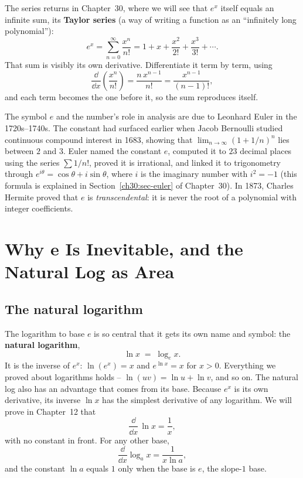 The series returns in Chapter~30, where we will see that $e^x$ itself equals an infinite sum, its \textbf{Taylor series} (a way of writing a function as an ``infinitely long polynomial''):
\[
e^x = \sum_{n=0}^{\infty}\frac{x^n}{n!} = 1 + x + \frac{x^2}{2!} + \frac{x^3}{3!}+\cdots.
\]
That sum is visibly its own derivative. Differentiate it term by term, using
\[
\frac{\dd}{\dd x}\left(\frac{x^n}{n!}\right) = \frac{n\,x^{n-1}}{n!} = \frac{x^{n-1}}{(n-1)!},
\]
and each term becomes the one before it, so the sum reproduces itself.

\begin{historybox}
The symbol $e$ and the number's role in analysis are due to Leonhard Euler in the 1720s--1740s.
The constant had surfaced earlier when Jacob Bernoulli studied continuous compound interest in 1683,
showing that $\lim_{n\to\infty}(1+1/n)^n$ lies between $2$ and $3$. Euler named the constant $e$,
computed it to $23$ decimal places using the series $\sum 1/n!$, proved it is irrational, and linked it
to trigonometry through $e^{i\theta} = \cos\theta + i\sin\theta$, where $i$ is the imaginary number with $i^2=-1$
(this formula is explained in Section~\ref{ch30:sec-euler} of Chapter~30). In 1873, Charles Hermite proved that
$e$ is \emph{transcendental}: it is never the root of a polynomial with integer coefficients.
\end{historybox}

\section{Why e Is Inevitable, and the Natural Log as Area}

\subsection{The natural logarithm}

The logarithm to base $e$ is so central that it gets its own name and symbol: the \textbf{natural logarithm},
\[
\ln x \;=\; \log_e x.
\]
It is the inverse of $e^x$: $\ln(e^x)=x$ and $e^{\ln x}=x$ for $x>0$. Everything we proved about logarithms holds -- $\ln(uv)=\ln u+\ln v$, and so on. The natural log also has an advantage that comes from its base. Because $e^x$ is its own derivative, its inverse $\ln x$ has the simplest derivative of any logarithm. We will prove in Chapter~12 that
\[
\frac{\dd}{\dd x}\,\ln x = \frac{1}{x},
\]
with no constant in front. For any other base,
\[
\frac{\dd}{\dd x}\log_a x = \frac{1}{x\ln a},
\]
and the constant $\ln a$ equals $1$ only when the base is $e$, the slope-$1$ base.

